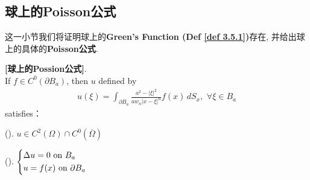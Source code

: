 \newpage

\subsection{球上的Poisson公式}
	这一小节我们将证明球上的\textbf{Green's Function (Def \ref{def 3.5.1})}存在, 并给出球上的具体的\textbf{Poisson公式}. 
	
	\vspace*{1em}
	
	\begin{thm}\label{thm 3.5.1}
		\textbf{[球上的Possion公式]}. \\
		If $f \in C^{0}(\partial B_a)$, then $u$ defined by
		\begin{align}
			u(\xi) 
			= \int_{\partial B_a} \frac{a^2 - |\xi|^2}{a w_n | x - \xi |^n} f(x) \, dS_x , \,\, \forall \xi \in B_a \label{3.4}
		\end{align}
		satisfies：
		\begin{center}
			(). \hspace{0.5em} $u \in C^2(\Omega) \cap C^0\left( \overline{\Omega} \right)$ 
				
			\vspace*{1em}
			
			(). \hspace{0.5em} 	 
			$\begin{dcases*}
				\Delta u = 0 \,\, \text{on} \,\, B_a \\
				u = f(x) \,\, \text{on} \,\, \partial B_a
			\end{dcases*}$
		\end{center}
		
		\vspace*{6em}
		

\end{thm}
